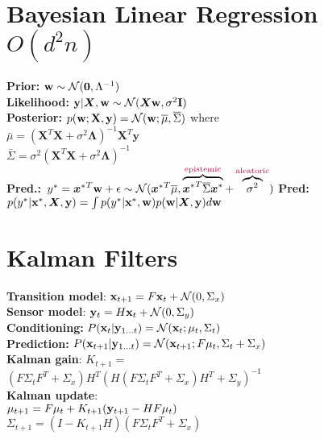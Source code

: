 \section{Bayesian Linear Regression $O(d^2n)$}
\textbf{Prior:} ${\mathbf{w}}\sim\mathcal{N}(\mathbf{0},\Lambda^{-1})$\\
\textbf{Likelihood:} ${\mathbf{y}}|{\bm{X}},{\mathbf{w}}\sim\mathcal{N}({\bm{X}}{\mathbf{w}},\sigma^2\mathbf{I})$\\
\textbf{Posterior:} $p({\mathbf{w}};\mathbf{X},\mathbf{y}) = \mathcal{N}({\mathbf{w}}; \overline\mu, \overline\Sigma)$ where\\
$\bar\mu = (\mathbf{X}^T\mathbf{X} +\sigma^2\bm{\Lambda})^{-1}\mathbf{X}^T\mathbf{y}$\\
\vspace*{-2em}
$\bar\Sigma = \sigma^2(\mathbf{X}^T\mathbf{X} +\sigma^2\bm{\Lambda})^{-1}$\\
\mbox{\textbf{Pred.:}
$y^* = {{\bm{x}}^*}^T{\mathbf{w}} + \epsilon\sim \mathcal{N}({{\bm{x}}^*}^T\overline\mu, \overbrace{{{\bm{x}}^*}^T\overline\Sigma{{\bm{x}}^*}}^\text{\color{purple}epistemic}+\overbrace{\sigma^2}^\text{\color{purple}aleatoric})$}
\textbf{\color{gray}Pred:}
$p(y^*|{\mathbf{x}}^*,{\bm{X}},{\mathbf{y}}) = \int p(y^*|{\mathbf{x}}^*,{\mathbf{w}})p({\mathbf{w}}|{\bm{X}},{\mathbf{y}}) d{\mathbf{w}}$

\section{Kalman Filters}
\textbf{Transition model}:
\mbox{${\mathbf{x}}_{t+1}=F{\mathbf{x}}_t + \mathcal{N}(0, \Sigma_x)$}\\
\textbf{Sensor model}:
${\mathbf{y}}_{t} = H{\mathbf{x}}_t + \mathcal{N}(0, \Sigma_y)$\\
\textbf{Conditioning:} $P({\mathbf{x}}_t|{\mathbf{y}}_{1\ldots t}) = \mathcal{N}({\mathbf{x}}_t;\mu_t, \Sigma_t)$\\
\textbf{Prediction:} $P({\mathbf{x}}_{t+1}|{\mathbf{y}}_{1\ldots t}) = \mathcal{N}({\mathbf{x}}_{t+1};F\mu_t, \Sigma_t + \Sigma_x)$\\
\textbf{Kalman gain}:
$K_{t+1}=$\\$(F\Sigma_t F^T+\Sigma_x)H^T(H(F\Sigma_t F^T+\Sigma_x)H^T+ \Sigma_y)^{-1}$\\
\textbf{Kalman update}:\\
$\mu_{t+1}=F\mu_t+K_{t+1}({\mathbf{y}}_{t+1}-HF\mu_t)$\\
$\Sigma_{t+1}=(I-K_{t+1}H)(F\Sigma_tF^T + \Sigma_x)$\\


